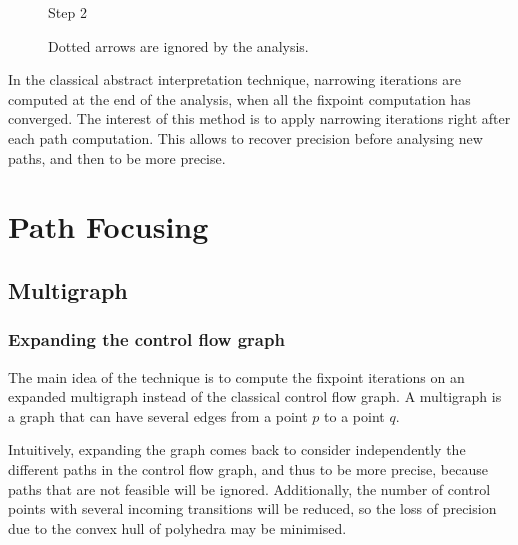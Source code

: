 \documentclass[a4paper,english,titlepage,11pt]{report}
\begin{document}
\begin{figure}[!h]
\begin{minipage}[c]{.46\linewidth}
\begin{tikzpicture}[->,>=stealth',auto,node distance=1.5cm,
                    semithick,font=\footnotesize]
\end{tikzpicture}
\centering Step 2
   \end{minipage}
   \caption{Dotted arrows are ignored by the analysis.}
\label{gopanreps}
\end{figure}
\FloatBarrier

In the classical abstract interpretation technique, narrowing iterations are
computed at the end of the analysis, when all the fixpoint computation has
converged.
The interest of this method is to apply narrowing iterations right after each
path computation. This allows to recover precision before analysing new paths,
and then to be more precise. 

 \section{Path Focusing}

	\subsection{Multigraph}

	\subsubsection{Expanding the control flow graph}
	The main idea of the technique is to compute the fixpoint iterations on an
	expanded multigraph instead of the classical control flow graph. A
	multigraph is a graph that can have several edges from a point $p$ to a
	point $q$. 

	Intuitively, expanding the graph comes back to consider independently the
	different paths in the control flow graph, and thus to be more precise,
	because paths that are not feasible will be ignored. Additionally, the
	number of control points with several incoming transitions will be reduced,
	so the loss of precision due to the convex hull of polyhedra may be
	minimised.
\end{document}
